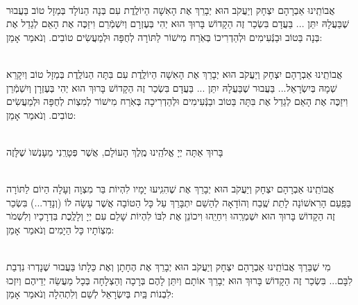 \documentclass[twoside, openany, parskip=half, 11pt]{book}
\begin{document}
\begin{sometimes}



\\
אֲבוֹתֵֽינוּ אַבְרָהָם יִצְחָק וְיַעֲקֹב הוּא יְבָרֵךְ אֶת הָאִשָׁה הַיוֹלֶֽדֶת 
 עִם בְּנָה הַנוֹלָד בְּמַזָל טוֹב בַּעֲבוּר שֶׁבַּעֲלָהּ יִתֵּן ... בַּעֲדָם בִּשְׂכַר זֶה הַקָדוֹשׁ בָּרוּךְ הוּא יְהִי בְּעֶזְרָם וְיִשְׁמְֿרֵם וִיזַכֶּה אֶת הָאֵם לְגַדֵל אֶת בְּנָה בַּטוֹב וּבַנְּֿעִימִים וּלְהַדְרִיכוֹ בְּאֹֽרַח מִישׁוֹר לַתּוֹרָה לְחֻפָּה וּלְמַעֲשִׂים טוֹבִים. וְנֹאמַר אָמֵן:
 


\\
 אֲבוֹתֵֽינוּ אַבְרָהָם יִצְחָק וְיַעֲקֹב הוּא יְבָרֵךְ אֶת הָאִשָׁה הַיוֹלֶֽדֶת 
 עִם בִּתָּה הַנוֹלֶֽדֶת בְּמַזָל טוֹב וְיִקָרֵא שְׁמָהּ בְּיִשְׂרָאֵל... בַּעֲבוּר שֶׁבַּעֲלָהּ יִתֵּן ... בַּעֲדָם בִּשְׂכַר זֶה הַקָדוֹשׁ בָּרוּךְ הוּא יְהִי בְּעֶזְרָן וְיִשְׁמְֿרֵן וִיזַכֶּה אֶת הָאֵם לְגַדֵל אֶת בִּתָּה בַּטוֹב ובַנְּֿעִימִים וּלְהַדְרִיכָה בְּאֹֽרַח מִישׁוֹר לְמִצְוֹת לְחֻפָּה וּלְמַעֲשִׂים טוֹבִים. וְנֹאמַר אָמֵן:

\\
 בָּרוּךְ אַתָּה יְיָ אֱלֹהֵֽינוּ מֶֽלֶךְ הָעוֹלָם, אֲשֶׁר פְּטָרַֽנִי מֵעָנְשׁוׂ שֶׁלָּזֶה
 
\\
אֲבוֹתֵֽינוּ אַבְרָהָם יִצְחָק וְיַעֲקֹב הוּא יְבָרֵךְ אֶת 
 שֶׁהִגִֽיעוּ יָמָיו לִהְיוֹת בַּר מִצְוָה וְעָלָה הַיוֹם לַתּוֹרָה בַּפַּֽעַם הָרִאשׁוֹנָה לָתֵת שֶֽׁבַח וְהוֹדָאָה לְהַשֵׁם יִתְבָּרַךְ עַל כָּל הַטוֹבָה אֲשֶׁר עָשָׂה לוֹ (וְנָדַר...) בִּשְׂכַר זֶה הַקָדוֹשׁ בָּרוּךְ הוּא יִשְׁמְרֵֽהוּ וִיחַיֵֽהוּ וִיכוֹנֵן אֶת לִבּוֹ לִהְיוֹת שָׁלֵם עִם יְיָ וְלָלֶֽכֶת בִּדְרָכָיו וְלִשְׁמֹר מִצְוֹתָיו כָּל הַיָמִים וְנֹאמַר אָמֵן:


\\
מִי שֶׁבֵּרַךְ אֲבוֹתֵֽינוּ אַבְרָהָם יִצְחָק וְיַעֲקֹב הוּא יְבָרֵךְ אֶת הֶחָתָן  וְאֶת כַּלָתוֹ בַּעֲבוּר שֶׁנָדְרוּ נִדְבַת לִבָּם... בִּשְׂכַר זֶה הַקָדוֹשׁ בָּרוּךְ הוּא יְבָרֵךְ אוֹתָם וְיִתֵּן לָהֶם בְּרָכָה וְהַצְלָחָה בְּכָל מַעֲשֵׂה יְדֵיהֶם וְיִזְכוּ לִבְנוֹת בַּֽיִת בְּיִשְׂרָאֵל לְשֵׁם וְלִתְהִלָה  וְנֹאמַר אָמֵן:


\end{sometimes}
\end{document}
